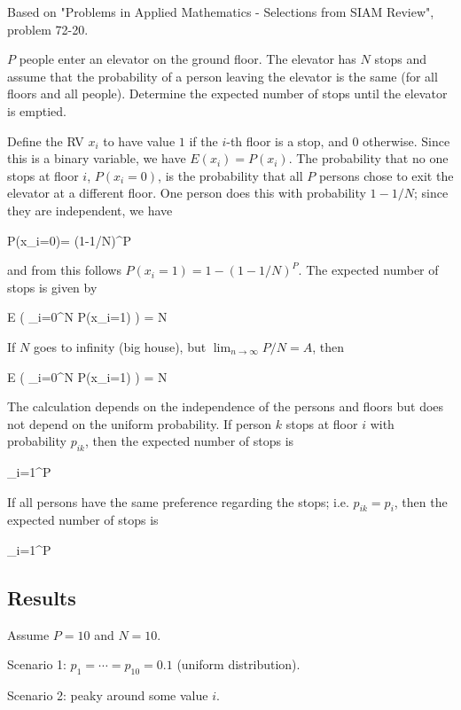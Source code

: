 
Based on "Problems in Applied Mathematics - Selections from SIAM Review", problem 72-20.

$P$ people enter an elevator on the ground floor. The elevator has $N$ stops and assume that the probability of a person leaving the elevator is the same (for all floors and all people). Determine the expected number of stops until the elevator is emptied.

Define the RV $x_i$ to have value $1$ if the $i$-th floor is a stop, and $0$ otherwise. Since this is a binary variable, we have $E(x_i) = P(x_i)$. The probability that no one stops at floor $i$, $P(x_i=0)$, is the probability that all $P$ persons chose to exit the elevator at a different floor. One person does this with probability $1-1/N$; since they are independent, we have

\bee
P(x_i=0)= (1-1/N)^P
\eee

and from this follows $P(x_i=1)= 1-(1-1/N)^P$. The expected number of stops is given by

\bee
E \left( \sum_{i=0}^N P(x_i=1) \right) = N \left[ 1-(1-1/N)^P \right]
\eee

If $N$ goes to infinity (big house), but $\lim_{n \rightarrow \infty} P/N = A$, then

\bee
E \left( \sum_{i=0}^N P(x_i=1) \right) = N \left[ 1-e^{-A} \right]
\eee

The calculation depends on the independence of the persons and floors but does not depend on the uniform probability. If person $k$ stops at floor $i$ with probability $p_{ik}$, then the expected number of stops is

\bee
\sum_{i=1}^P \left[ 1-\prod_{k=1}^N (1-p_{ik}) \right]
\eee

If all persons have the same preference regarding the stops; i.e. $p_{ik} = p_i$, then the expected number of stops is

\bee
\sum_{i=1}^P \left[ 1- (1-p_{i})^P \right]
\eee

\subsection{Results}

Assume $P=10$ and $N = 10$.

Scenario 1: $p_1 = \cdots = p_10 = 0.1$ (uniform distribution).

Scenario 2: peaky around some value $i$.